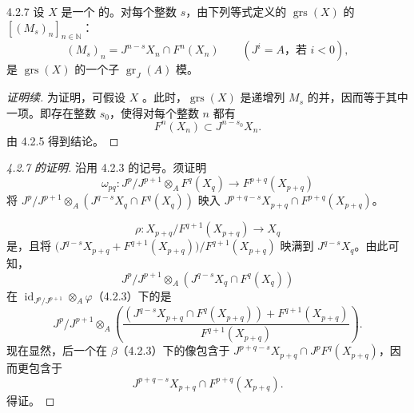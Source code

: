 \begin{SGAresult}{}{4.2.7}
设 $X$ 是一个 的。对每个整数 $s$，由下列等式定义的 $\operatorname{grs}(X)$ 的 $[(M_s)_n]_{n\in\mathbb N}$：
\[
(M_s)_n=J^{n-s}X_n\cap F^n(X_n)\qquad(J^i=A\text{，若 }i<0),
\]
是 $\operatorname{grs}(X)$ 的一个子 $\operatorname{gr}_J(A)$ 模。
\end{SGAresult}
\begin{proof}[证明续]
为证明，可假设 $X$ 。此时，$\operatorname{grs}(X)$ 是递增列 $M_s$ 的并，因而等于其中一项。即存在整数 $s_0$，使得对每个整数 $n$ 都有
\[
F^n(X_n)\subset J^{n-s_0}X_n.
\]
由 4.2.5 得到结论。
\end{proof}
\begin{proof}[4.2.7 的证明]
沿用 4.2.3 的记号。须证明
\[
\omega_{pq}:J^p/J^{p+1}\otimes_A F^q(X_q)\longrightarrow F^{p+q}(X_{p+q})
\]
将 $J^p/J^{p+1}\otimes_A(J^{q-s}X_q\cap F^q(X_q))$ 映入 $J^{p+q-s}X_{p+q}\cap F^{p+q}(X_{p+q})$。

\[
\rho:X_{p+q}/F^{q+1}(X_{p+q})\longrightarrow X_q
\]
是，且将 $\bigl(J^{q-s}X_{p+q}+F^{q+1}(X_{p+q})\bigr)/F^{q+1}(X_{p+q})$ 映满到 $J^{q-s}X_q$。由此可知，
\[
J^p/J^{p+1}\otimes_A(J^{q-s}X_q\cap F^q(X_q))
\]
在 $\operatorname{id}_{J^p/J^{p+1}}\otimes_A\varphi$（4.2.3）下的是
\[
J^p/J^{p+1}\otimes_A\left(\frac{(J^{q-s}X_{p+q}\cap F^q(X_{p+q}))+F^{q+1}(X_{p+q})}{F^{q+1}(X_{p+q})}\right).
\]
现在显然，后一个在 $\beta$（4.2.3）下的像包含于 $J^{p+q-s}X_{p+q}\cap J^pF^q(X_{p+q})$，因而更包含于
\[
J^{p+q-s}X_{p+q}\cap F^{p+q}(X_{p+q}).
\]
得证。
\end{proof}
